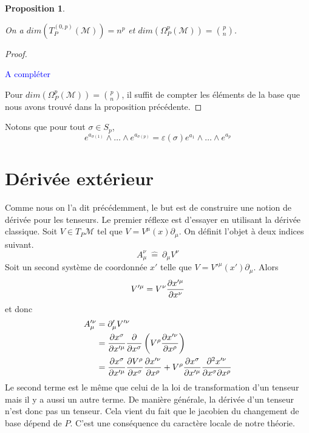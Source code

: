 \documentclass[a4paper,11pt]{report}
\theoremstyle{definition}
\theoremstyle{plain}
\newtheorem{prop}[thm]{Proposition}
\theoremstyle{definition}
\theoremstyle{remark}
\newcommand{\comp}{\begin{center}\textcolor{blue}{A compléter}\end{center}}
\newcommand{\M}{\mathscr{M}}
\newcommand{\p}{\partial}
\begin{document}
            \begin{prop}\begin{leftbar}
                On a $dim(T_P^{(0,p)}(\M)) = n^p$ et $dim(\Omega_P^p(\M)) = {p \choose n}$.
            \end{leftbar}\end{prop}
            
            \begin{proof}${}$\\
                 \comp
                 Pour $dim(\Omega_P^p(\M)) = {p \choose n}$, il suffit de compter les éléments de la base que nous avons trouvé dans la proposition précédente.
            \end{proof}
            
            Notons que pour tout $\sigma\in S_p$,
            \begin{equation}
                e^{a_{\sigma(1)}}\wedge\dots\wedge e^{a_{\sigma(p)}} = \varepsilon(\sigma)e^{a_1}\wedge\dots \wedge e^{a_p}
            \end{equation}
        
        \section{Dérivée extérieur}
        
            Comme nous on l'a dit précédemment, le but est de construire une notion de dérivée pour les tenseurs. Le premier réflexe est d'essayer en utilisant la dérivée classique. Soit $V\in T_P\M$ tel que $V = V^\mu(x) \p_\mu$. On définit l'objet à deux indices suivant.
            \begin{equation}
                A_\mu^\nu ~\hat{=}~ \p_\mu V^\nu
            \end{equation}
            Soit un second système de coordonnée $x'$ telle que $V = V'^\mu(x') \p_\mu$. Alors 
            \begin{equation}
                V'^\mu = V^\nu \pdv{x'^\mu}{x^\nu}
            \end{equation}
            et donc
            \begin{align}
                A'^\nu_\mu &= \p'_\mu V'^\nu \\
                &= \pdv{x^\sigma}{x'^\mu}\pdv{}{x^\sigma}\left( V^\rho \pdv{x'^\nu}{x^\rho} \right)\\
                &= \pdv{x^\sigma}{x'^\mu}\pdv{V^\rho}{x^\sigma}\pdv{x'^\nu}{x^\rho}+V^\rho\pdv{x^\sigma}{x'^\mu}  \pdv{x'^\nu}{x^\sigma}{x^\rho}
            \end{align}
            Le second terme est le même que celui de la loi de transformation d'un tenseur mais il y a aussi un autre terme. De manière générale, la dérivée d'un tenseur n'est donc pas un tenseur. Cela vient du fait que le jacobien du changement de base dépend de $P$. C'est une conséquence du caractère locale de notre théorie.
            
\end{document}
